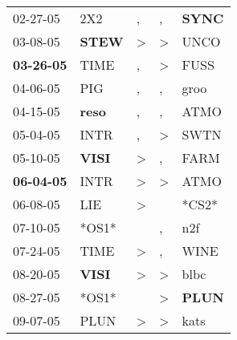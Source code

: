 \begin{supertabular}{p{0.07\textwidth}p{0.06\textwidth}p{0.02\textwidth}p{0.02\textwidth}p{0.06\textwidth}}
          02-27-05\textsuperscript{} &            2X2\textsuperscript{} &                , &                , &  \textbf{SYNC\textsuperscript{}} \\
          03-08-05\textsuperscript{} &  \textbf{STEW\textsuperscript{}} &     \textgreater &     \textgreater &           UNCO\textsuperscript{} \\
 \textbf{03-26-05\textsuperscript{}} &           TIME\textsuperscript{} &                , &     \textgreater &           FUSS\textsuperscript{} \\
          04-06-05\textsuperscript{} &            PIG\textsuperscript{} &                , &                , &           groo\textsuperscript{} \\
          04-15-05\textsuperscript{} &  \textbf{reso\textsuperscript{}} &                , &                , &           ATMO\textsuperscript{} \\
          05-04-05\textsuperscript{} &           INTR\textsuperscript{} &                , &     \textgreater &           SWTN\textsuperscript{} \\
          05-10-05\textsuperscript{} &  \textbf{VISI\textsuperscript{}} &     \textgreater &                , &           FARM\textsuperscript{} \\
 \textbf{06-04-05\textsuperscript{}} &           INTR\textsuperscript{} &     \textgreater &     \textgreater &           ATMO\textsuperscript{} \\
          06-08-05\textsuperscript{} &            LIE\textsuperscript{} &     \textgreater &                  &                            *CS2* \\
          07-10-05\textsuperscript{} &                            *OS1* &                  &                , &            n2f\textsuperscript{} \\
          07-24-05\textsuperscript{} &           TIME\textsuperscript{} &     \textgreater &                , &           WINE\textsuperscript{} \\
          08-20-05\textsuperscript{} &  \textbf{VISI\textsuperscript{}} &     \textgreater &     \textgreater &           blbc\textsuperscript{} \\
          08-27-05\textsuperscript{} &                            *OS1* &                  &     \textgreater &  \textbf{PLUN\textsuperscript{}} \\
          09-07-05\textsuperscript{} &           PLUN\textsuperscript{} &     \textgreater &     \textgreater &           kats\textsuperscript{} \\

\end{supertabular}
